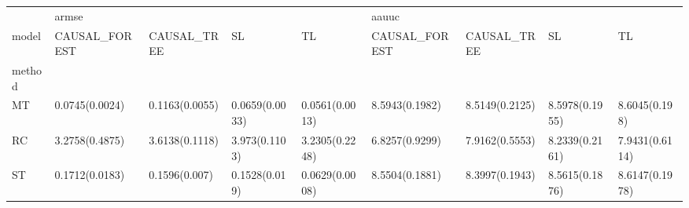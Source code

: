 \begin{tabular}{lllllllll}
\toprule
{} & \multicolumn{4}{l}{armse} & \multicolumn{4}{l}{aauuc} \\
model &   CAUSAL\_FOREST &     CAUSAL\_TREE &              SL &              TL &   CAUSAL\_FOREST &     CAUSAL\_TREE &              SL &              TL \\
method &                 &                 &                 &                 &                 &                 &                 &                 \\
\midrule
MT     &  0.0745(0.0024) &  0.1163(0.0055) &  0.0659(0.0033) &  0.0561(0.0013) &  8.5943(0.1982) &  8.5149(0.2125) &  8.5978(0.1955) &   8.6045(0.198) \\
RC     &  3.2758(0.4875) &  3.6138(0.1118) &   3.973(0.1103) &  3.2305(0.2248) &  6.8257(0.9299) &  7.9162(0.5553) &  8.2339(0.2161) &  7.9431(0.6114) \\
ST     &  0.1712(0.0183) &   0.1596(0.007) &   0.1528(0.019) &  0.0629(0.0008) &  8.5504(0.1881) &  8.3997(0.1943) &  8.5615(0.1876) &  8.6147(0.1978) \\
\bottomrule
\end{tabular}
